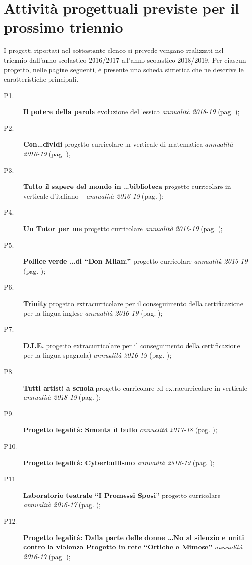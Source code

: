 \documentclass[12pt,a4paper,oneside]{memoir}
\begin{document}
\chapter[Attività progettuali]{Attività progettuali previste per il prossimo triennio}

I progetti riportati nel sottostante elenco si prevede vengano realizzati nel triennio dall'anno scolastico 2016/2017 all'anno scolastico 2018/2019. Per ciascun progetto, nelle pagine seguenti, è presente una scheda sintetica che ne descrive le caratteristiche principali.
\begin{description}
\item[P1.] \textbf{Il potere della parola} evoluzione del lessico \emph{annualità 2016-19} (pag. \pageref{P1});
\item[P2.] \textbf{Con\ldots dividi} progetto curricolare in verticale di matematica \emph{annualità 2016-19} (pag. \pageref{P2});
\item[P3.] \textbf{Tutto il sapere del mondo in \ldots biblioteca} progetto curricolare in verticale d'italiano -- \emph{annualità 2016-19} (pag. \pageref{P3});
\item[P4.] \textbf{Un Tutor per me} progetto curricolare \emph{annualità 2016-19} (pag. \pageref{P4});
\item[P5.] \textbf{Pollice verde \ldots di ``Don Milani''} progetto curricolare \emph{annualità 2016-19} (pag. \pageref{P5});
\item[P6.] \textbf{Trinity} progetto extracurricolare per il conseguimento della certificazione per la lingua inglese \emph{annualità 2016-19} (pag. \pageref{P6});
\item[P7.] \textbf{D.I.E.} progetto extracurricolare per il conseguimento della certificazione per la lingua spagnola) \emph{annualità 2016-19} (pag. \pageref{P7});
\item[P8.] \textbf{Tutti artisti a scuola} progetto curricolare ed extracurricolare in verticale \emph{annualità 2018-19} (pag. \pageref{P8});
\item[P9.] \textbf{Progetto legalità: Smonta il bullo} \emph{annualità 2017-18} (pag. \pageref{P9});
\item[P10.] \textbf{Progetto legalità: Cyberbullismo} \emph{annualità 2018-19} (pag. \pageref{P10});
\item[P11.] \textbf{Laboratorio teatrale ``I Promessi Sposi''} progetto curricolare \emph{annualità 2016-17} (pag. \pageref{P11});
\item[P12.] \textbf{Progetto legalità: Dalla parte delle donne \ldots No al silenzio e uniti contro la violenza Progetto in rete ``Ortiche e Mimose''} \emph{annualità 2016-17} (pag. \pageref{P12});

\end{description}
\end{document}
